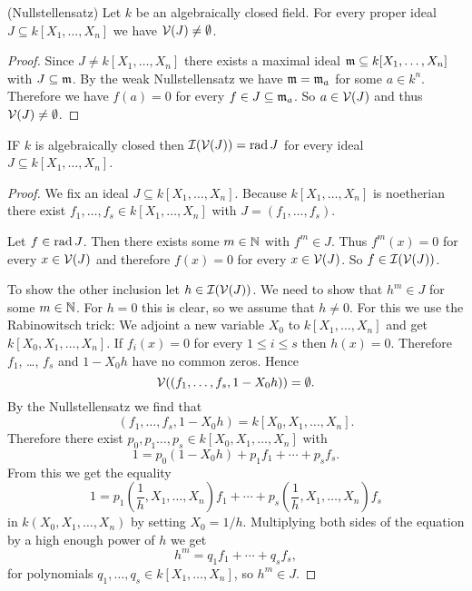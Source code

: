 \begin{cor}(Nullstellensatz)
 Let $k$ be an algebraically closed field. For every proper ideal $J \subseteq k[X_1, \dotsc, X_n]$ we have $\mathcal{V}(J) \neq \emptyset$.
\end{cor}
\begin{proof}
 Since $J \neq k[X_1, \dotsc, X_n]$ there exists a maximal ideal $\mathfrak{m} \subseteq k[X_1, \dotsc, X_n]$ with $J \subseteq \mathfrak{m}$. By the weak Nullstellensatz we have $\mathfrak{m} = \mathfrak{m}_a$ for some $a \in k^n$. Therefore we have $f(a) = 0$ for every $f \in J \subseteq \mathfrak{m}_a$. So $a \in \mathcal{V}(J)$ and thus $\mathcal{V}(J) \neq \emptyset$.
\end{proof}


\begin{cor}
 IF $k$ is algebraically closed then $\mathcal{I}(\mathcal{V}(J)) = \operatorname{rad} J$ for every ideal $J \subseteq k[X_1, \dotsc, X_n]$.
\end{cor}
\begin{proof}
 We fix an ideal $J \subseteq k[X_1, \dotsc, X_n]$. Because $k[X_1, \dotsc, X_n]$ is noetherian there exist $f_1, \dotsc, f_s \in k[X_1, \dotsc, X_n]$ with $J = (f_1, \dotsc, f_s)$.
 
 Let $f \in \operatorname{rad} J$. Then there exists some $m \in \mathbb{N}$ with $f^m \in J$. Thus $f^m(x) = 0$ for every $x \in \mathcal{V}(J)$ and therefore $f(x) = 0$ for every $x \in \mathcal{V}(J)$. So $f \in \mathcal{I}(\mathcal{V}(J))$.
 
 To show the other inclusion let $h \in \mathcal{I}(\mathcal{V}(J))$. We need to show that $h^m \in J$ for some $m \in \mathbb{N}$. For $h = 0$ this is clear, so we assume that $h \neq 0$. For this we use the Rabinowitsch trick: We adjoint a new variable $X_0$ to $k[X_1, \dotsc, X_n]$ and get $k[X_0, X_1, \dotsc, X_n]$. If $f_i(x) = 0$ for every $1 \leq i \leq s$ then $h(x) = 0$. Therefore $f_1$, \dots, $f_s$ and $1 - X_0 h$ have no common zeros. Hence
 \[
  \mathcal{V}((f_1, \dotsc, f_s, 1 - X_0 h)) = \emptyset.
 \]
 By the Nullstellensatz we find that
 \[
  (f_1, \dotsc, f_s, 1 - X_0 h) = k[X_0, X_1, \dotsc, X_n].
 \]
 Therefore there exist $p_0, p_1 \ldots, p_s \in k[X_0, X_1, \dotsc, X_n]$ with
 \[
  1 = p_0 (1 - X_0 h) + p_1 f_1 + \dotsb + p_s f_s.
 \]
 From this we get the equality
 \[
  1 = p_1\left(\frac{1}{h}, X_1, \dotsc, X_n\right) f_1 + \dotsb + p_s\left(\frac{1}{h}, X_1, \dotsc, X_n\right) f_s
 \]
 in $k(X_0, X_1, \dotsc, X_n)$ by setting $X_0 = 1/h$. Multiplying both sides of the equation by a high enough power of $h$ we get
 \[
  h^m = q_1 f_1 + \dotsb + q_s f_s,
 \]
 for polynomials $q_1, \dotsc, q_s \in k[X_1, \dotsc, X_n]$, so $h^m \in J$.
\end{proof}


